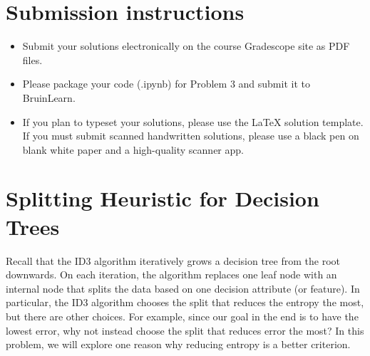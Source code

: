 \documentclass[11pt]{article}
\begin{document}
\author{}
\date{}
\vspace{-1in}
\maketitle
\vspace{-0.75in}





\ifsoln 
\else
\section*{Submission instructions}
\begin{itemize}
\item 
Submit your solutions electronically on the course Gradescope site as PDF files.
\item Please package your code (.ipynb) for Problem 3 and submit it to BruinLearn.
\item If you plan to typeset your solutions, please use the LaTeX solution template. If you must submit scanned handwritten solutions, please use a black pen on blank white paper and a high-quality scanner app.
\end{itemize}
\fi

\ifnotsolution{\newpage}



\section{Splitting Heuristic for Decision Trees }

Recall that the ID3 algorithm iteratively grows a decision tree from the root downwards. On each iteration, the algorithm replaces one leaf node with an internal node that splits the data based on one decision attribute (or feature). In particular, the ID3 algorithm chooses the split that reduces the entropy the most, but there are other choices. For example, since our goal in the end is to have the lowest error, why not instead choose the split that reduces error the most? In this problem, we will explore one reason why reducing entropy is a better criterion.
\end{document}
